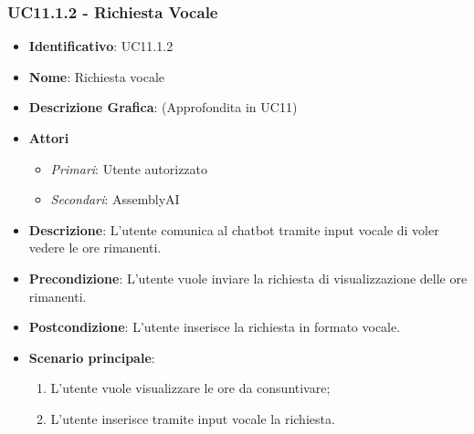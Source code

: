 \subsubsection{UC11.1.2 - Richiesta Vocale}
\begin{itemize}
	\item \textbf{Identificativo}: UC11.1.2
	\item \textbf{Nome}: Richiesta vocale
	\item \textbf{Descrizione Grafica}: (Approfondita in UC11)
	\item \textbf{Attori}
	\begin{itemize} 
		\item \textit{Primari}: Utente autorizzato
		\item \textit{Secondari}: AssemblyAI
	\end{itemize}
	\item \textbf{Descrizione}: L'utente comunica al chatbot tramite input vocale di voler vedere le ore rimanenti.
	\item \textbf{Precondizione}: L'utente vuole inviare la richiesta di visualizzazione delle ore rimanenti.
	\item \textbf{Postcondizione}: L'utente inserisce la richiesta in formato vocale.
	\item \textbf{Scenario principale}:
	\begin{enumerate}
		\item L'utente vuole visualizzare le ore da consuntivare;
		\item L'utente inserisce tramite input vocale la richiesta.
	\end{enumerate}
\end{itemize}

